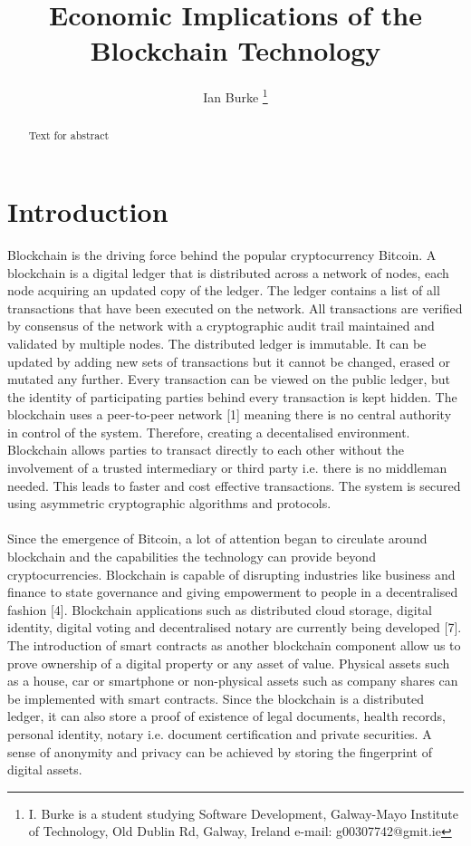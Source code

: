 \documentclass[report]{IEEEtran}
\begin{document}
\title{Economic Implications of the Blockchain Technology}
\author{Ian Burke %
\thanks{I. Burke is a student studying
Software Development, Galway-Mayo Institute of Technology, Old Dublin Rd, Galway, Ireland e-mail: g00307742@gmit.ie}%
}

\maketitle

\begin{abstract}
Text for abstract
\end{abstract}


\section{Introduction}
Blockchain is the driving force behind the popular cryptocurrency Bitcoin. A blockchain is a digital ledger that is distributed across a network of nodes, each node acquiring an updated copy of the ledger. The ledger contains a list of all transactions that have been executed on the network. All transactions are verified by consensus of the network with a cryptographic audit trail maintained and validated by multiple nodes. The distributed ledger is immutable. It can be updated by adding new sets of transactions but it cannot be changed, erased or mutated any further. Every transaction can be viewed on the public ledger, but the identity of participating parties behind every transaction is kept hidden. The blockchain uses a peer-to-peer network [1] meaning there is no central authority in control of the system. Therefore, creating a decentalised environment. Blockchain allows parties to transact directly to each other without the involvement of a trusted intermediary or third party i.e. there is no middleman needed. This leads to faster and cost effective transactions. The system is secured using asymmetric cryptographic algorithms and protocols.
\\\\ Since the emergence of Bitcoin, a lot of attention began to circulate around blockchain and the capabilities the technology can provide beyond cryptocurrencies. Blockchain is capable of disrupting industries like business and finance to state governance and giving empowerment to people in a decentralised fashion [4]. Blockchain applications such as distributed cloud storage, digital identity, digital voting and decentralised notary are currently being developed [7]. The introduction of smart contracts as another blockchain component allow us to prove ownership of a digital property or any asset of value. Physical assets such as a house, car or smartphone or non-physical assets such as company shares can be implemented with smart contracts. Since the blockchain is a distributed ledger, it can also store a proof of existence of legal documents, health records, personal identity, notary i.e. document certification and private securities. A sense of anonymity and privacy can be achieved by storing the fingerprint of digital assets. 
\end{document}
